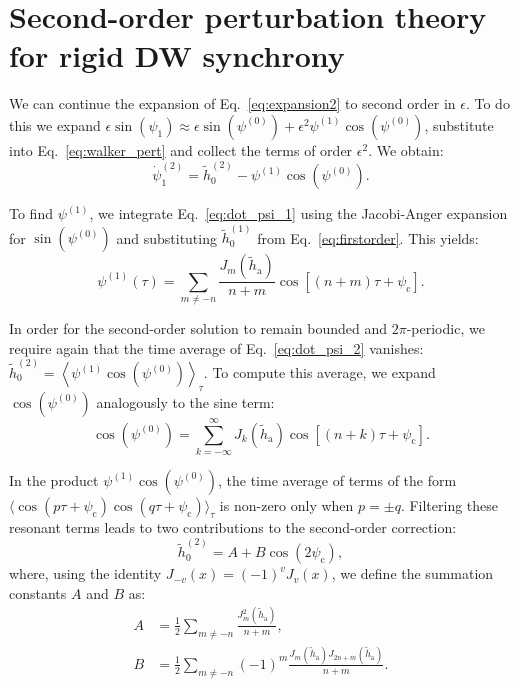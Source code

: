 \documentclass[prb,aps,twocolumn,superscriptaddress,floatfix]{revtex4-1}
\begin{document}
\section{Second-order perturbation theory for rigid DW synchrony}
\label{ap:segundo_orden}

We can continue the expansion of Eq.~\eqref{eq:expansion2} to second order in $\epsilon$. To do this we expand $\epsilon\sin(\psi_1) \approx \epsilon \sin\left(\psi^{(0)}\right) + \epsilon^2 \psi^{(1)} \cos\left(\psi^{(0)}\right)$, substitute into Eq.~\eqref{eq:walker_pert} and collect the terms of order $\epsilon^2$. We obtain:
%
\begin{equation}
\dot{\psi}_1^{(2)} = \tilde h_0^{(2)} - \psi^{(1)} \cos\left(\psi^{(0)}\right).
    \label{eq:dot_psi_2}    
\end{equation}

To find $\psi^{(1)}$, we integrate Eq.~\eqref{eq:dot_psi_1} using the Jacobi-Anger expansion for $\sin\left(\psi^{(0)}\right)$ and substituting $\tilde h_0^{(1)}$ from Eq.~\eqref{eq:firstorder}. This yields:
%
\begin{equation}
    \psi^{(1)}(\tau) = \sum_{m \neq -n} \frac{J_m(\tilde h_\text{a})}{n+m} \cos[(n+m)\tau + \psi_\text{c}].
\end{equation}

In order for the second-order solution to remain bounded and $2\pi$-periodic, we require again that the time average of Eq.~\eqref{eq:dot_psi_2} vanishes: $\tilde h_0^{(2)} = \left\langle \psi^{(1)} \cos\left(\psi^{(0)}\right) \right\rangle_\tau$. To compute this average, we expand $\cos\left(\psi^{(0)}\right)$ analogously to the sine term:
%
\begin{equation}
    \cos\left(\psi^{(0)}\right) = \sum_{k=-\infty}^{\infty} J_k(\tilde h_\text{a}) \cos[(n+k)\tau + \psi_\text{c}].
\end{equation}

In the product $\psi^{(1)} \cos\left(\psi^{(0)}\right)$, the time average of terms of the form $\langle \cos(p\tau+\psi_\text{c}) \cos(q\tau+\psi_\text{c}) \rangle_\tau$ is non-zero only when $p=\pm q$. Filtering these resonant terms leads to two contributions to the second-order correction:
%
\begin{equation}
    \tilde h_0^{(2)} = A + B \cos(2\psi_\text{c}),
    \label{eq:secondorder_h0}
\end{equation}
%
where, using the identity $J_{-v}(x) = (-1)^v J_v(x)$, we define the summation constants $A$ and $B$ as:
%
\begin{align}
    A &= \frac{1}{2}\sum_{m\neq -n} \frac{J_m^2(\tilde h_\text{a})}{n+m}, \\
    B &= \frac{1}{2}\sum_{m\neq -n} (-1)^m \frac{J_m(\tilde h_\text{a})J_{2n+m}(\tilde h_\text{a})}{n+m}.
\end{align}
\end{document}
